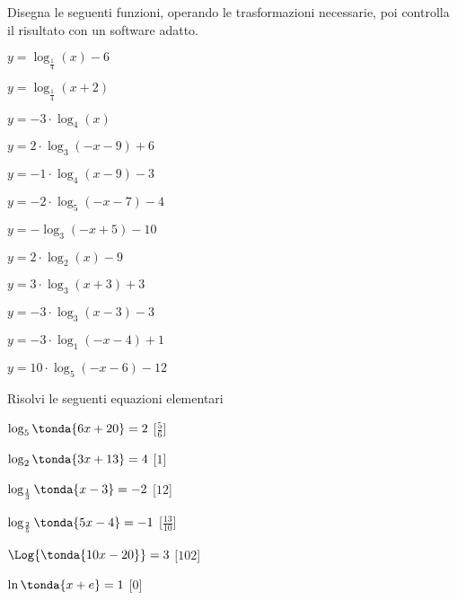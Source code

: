 \begin{esercizio}\label{ese:}
 Disegna le seguenti funzioni, operando le trasformazioni necessarie, poi 
controlla il risultato con un software adatto.
\begin{multicols}{2}
 \begin{enumeratea}
  \item  \(y=  \log_{\frac{1}{4}}\left(x \right) -6\)
  \item  \(y=  \log_{\frac{1}{4}}\left(x+2\right)\)
  \item  \(y=-3 \cdot \log_{4}\left(x\right)\)
  \item  \(y= 2 \cdot \log_{3}\left(-x-9\right) +6\)
  \item  \(y=-1 \cdot \log_{4}\left(x-9\right) -3\)
  \item  \(y=-2 \cdot \log_{5}\left(-x-7\right) -4\)
  \item  \(y= - \log_{3}\left(-x+5\right) -10\)
  \item  \(y= 2 \cdot \log_{2}\left(x \right) -9\)
  \item  \(y= 3 \cdot \log_{3}\left(x+3\right) +3\)
  \item  \(y= -3 \cdot \log_{3}\left(x-3\right) -3\)
  \item  \(y= -3 \cdot \log_{1}\left(-x-4\right) +1\)
  \item  \(y= 10 \cdot \log_{5}\left(-x-6\right) -12\)
 \end{enumeratea}
\end{multicols}
\end{esercizio}


\begin{esercizio}\label{ese:}
 Risolvi le seguenti equazioni elementari
\begin{multicols}{2}
 \begin{enumeratea}
  \item  \(\log_{5}{\tonda{6 x +20}} = 2\)
   \hfill [\( \frac{5}{6}\)]
  \item  \(\log_{2}{\tonda{3 x +13}} = 4\)
   \hfill [\( 1\)]
   \item  \(\log_{\frac{1}{3}}{\tonda{x-3}} = -2\)
   \hfill [\(12\)]
   \item  \(\log_{\frac{2}{5}}{\tonda{5 x -4}} = -1\)
   \hfill [\( \frac{13}{10}\)]
   \item  \(\Log{\tonda{10x-20}} = 3\)
   \hfill [\(102\)]
   \item  \(\ln{\tonda{x+e}} = 1\)
   \hfill [\(0\)]
 \end{enumeratea}
\end{multicols}
\end{esercizio}


